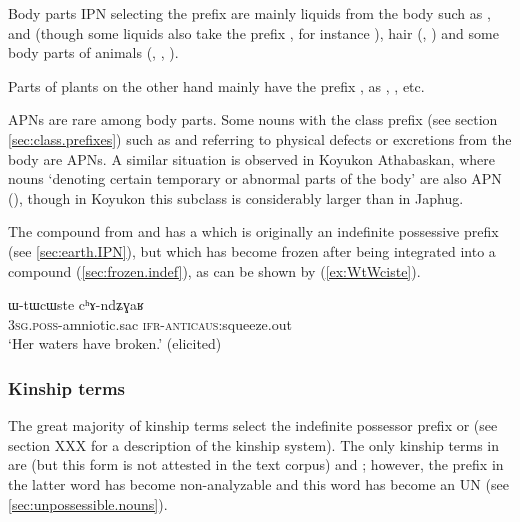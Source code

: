 Body parts IPN selecting the prefix  are mainly liquids from the body such as ,  and  (though some liquids also take the prefix , for instance ), hair (, ) and some body parts of animals (, , ).

Parts of plants on the other hand mainly have the prefix , as , ,  etc.

APNs are rare among body parts. Some nouns with the  class prefix (see section \ref{sec:class.prefixes}) such as  and  referring to physical defects or excretions from the body are APNs. A similar situation is observed in Koyukon Athabaskan, where nouns `denoting certain temporary or abnormal parts of the body' are also APN (\citealt[660]{thompson96koyukon}), though in Koyukon this subclass is considerably larger than in Japhug.

The compound  from  and  has a  which is originally an indefinite possessive prefix (see \ref{sec:earth.IPN}), but which has become frozen after being integrated into a compound (\ref{sec:frozen.indef}), as can be shown by (\ref{ex:WtWciste}). 

\begin{exe}
\ex \label{ex:WtWciste}
\gll ɯ-tɯcɯste cʰɤ-ndʑɣaʁ \\
\textsc{3sg.poss}-amniotic.sac \textsc{ifr}-\textsc{anticaus}:squeeze.out \\
\glt `Her waters have broken.' (elicited)
\end{exe}


\subsubsection{Kinship terms} \label{sec:kinship}
The great majority of kinship terms select the indefinite possessor prefix  or  (see section XXX for a description of the kinship system). The only kinship terms in  are  (but this form is not attested in the text corpus) and ; however, the  prefix in the latter word has become non-analyzable and this word has become an UN (see \ref{sec:unpossessible.nouns}). 

